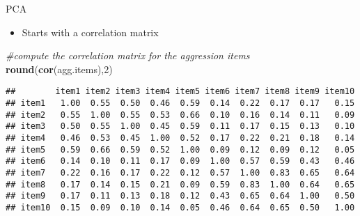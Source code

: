 \documentclass[
  ignorenonframetext,
]{beamer}
\newenvironment{Shaded}{\begin{snugshade}}{\end{snugshade}}
\newcommand{\CommentTok}[1]{\textcolor[rgb]{0.56,0.35,0.01}{\textit{#1}}}
\newcommand{\DecValTok}[1]{\textcolor[rgb]{0.00,0.00,0.81}{#1}}
\newcommand{\KeywordTok}[1]{\textcolor[rgb]{0.13,0.29,0.53}{\textbf{#1}}}
\newcommand{\NormalTok}[1]{#1}
\providecommand{\tightlist}{%
  \setlength{\itemsep}{0pt}\setlength{\parskip}{0pt}}
\begin{document}
\begin{frame}[fragile]{PCA}
\protect\hypertarget{pca}{}

\begin{itemize}
\tightlist
\item
  Starts with a correlation matrix
\end{itemize}

\begin{Shaded}
\begin{Highlighting}[]
\CommentTok{#compute the correlation matrix for the aggression items}
\KeywordTok{round}\NormalTok{(}\KeywordTok{cor}\NormalTok{(agg.items),}\DecValTok{2}\NormalTok{)}
\end{Highlighting}
\end{Shaded}

\begin{verbatim}
##        item1 item2 item3 item4 item5 item6 item7 item8 item9 item10
## item1   1.00  0.55  0.50  0.46  0.59  0.14  0.22  0.17  0.17   0.15
## item2   0.55  1.00  0.55  0.53  0.66  0.10  0.16  0.14  0.11   0.09
## item3   0.50  0.55  1.00  0.45  0.59  0.11  0.17  0.15  0.13   0.10
## item4   0.46  0.53  0.45  1.00  0.52  0.17  0.22  0.21  0.18   0.14
## item5   0.59  0.66  0.59  0.52  1.00  0.09  0.12  0.09  0.12   0.05
## item6   0.14  0.10  0.11  0.17  0.09  1.00  0.57  0.59  0.43   0.46
## item7   0.22  0.16  0.17  0.22  0.12  0.57  1.00  0.83  0.65   0.64
## item8   0.17  0.14  0.15  0.21  0.09  0.59  0.83  1.00  0.64   0.65
## item9   0.17  0.11  0.13  0.18  0.12  0.43  0.65  0.64  1.00   0.50
## item10  0.15  0.09  0.10  0.14  0.05  0.46  0.64  0.65  0.50   1.00
\end{verbatim}

\end{frame}
\end{document}
